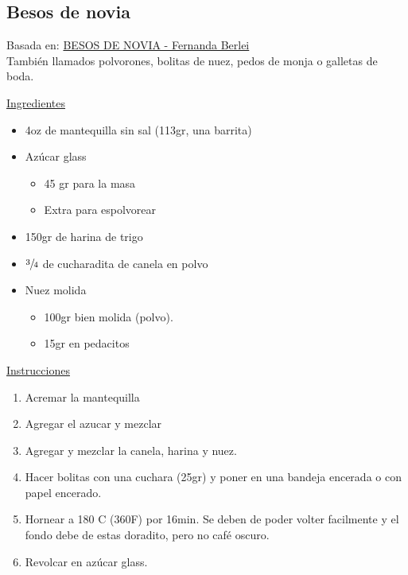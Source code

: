 \subsection{Besos de novia}

Basada en: \href{https://www.youtube.com/watch?v=V18ECzDqUjM}{BESOS DE NOVIA - Fernanda Berlei
} \\

También llamados polvorones, bolitas de nuez, pedos de monja o galletas de boda.

\underline{Ingredientes}

\begin{itemize}
\item 4oz de mantequilla sin sal (113gr, una barrita)
\item Azúcar glass
\begin{itemize}
\item 45 gr para la masa
\item Extra para espolvorear
\end{itemize}
\item 150gr de harina de trigo
\item $\sfrac{3}{4}$ de cucharadita de canela en polvo
\item Nuez molida
\begin{itemize}
\item 100gr bien molida (polvo).
\item 15gr en pedacitos
\end{itemize}
\end{itemize}


\underline{Instrucciones}

\begin{enumerate}
\item Acremar la mantequilla
\item Agregar el azucar y mezclar
\item Agregar y mezclar la canela, harina y nuez.
\item Hacer bolitas con una cuchara (\Sim 25gr) y poner en una bandeja encerada o con papel encerado.
\item Hornear a 180 C (360F) por \Sim 16min. Se deben de poder volter facilmente y el fondo debe de estas doradito, pero no café oscuro.
\item Revolcar en azúcar glass.
\end{enumerate}

